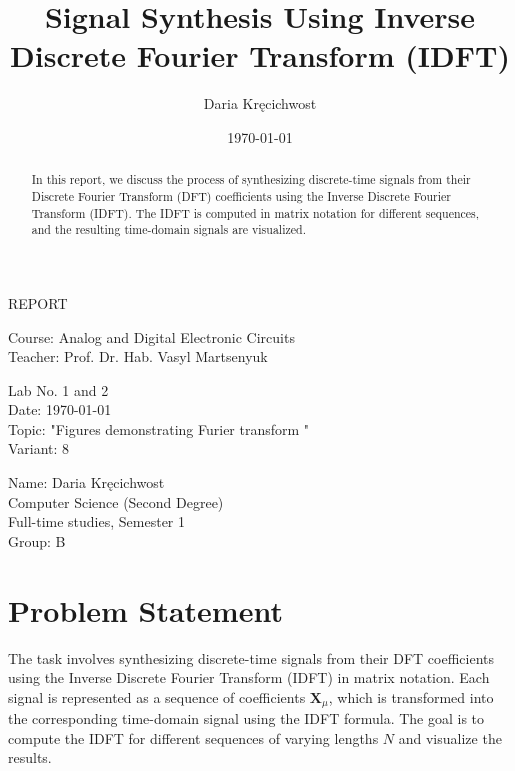 \documentclass[12pt]{article}
\title{Signal Synthesis Using Inverse Discrete Fourier Transform (IDFT)}
\author{Daria Kręcichwost}
\date{\today}
\begin{document}
\begin{titlepage}
    \centering
    \vspace*{2cm}
    
    \Huge
    REPORT
    
    \vspace{1cm}
    
    \Large
    Course: Analog and Digital Electronic Circuits \\
    Teacher: Prof. Dr. Hab. Vasyl Martsenyuk
    
    \vfill
    
    \Large
    Lab No. 1 and 2\\
    Date: \today \\
    Topic: "Figures demonstrating Furier transform " \\
    Variant: 8
    
    \vspace{1cm}
    
    \large
    Name: Daria Kręcichwost \\
    Computer Science (Second Degree) \\
    Full-time studies, Semester 1 \\
    Group: B
\end{titlepage}

\newpage

\maketitle

\begin{abstract}
In this report, we discuss the process of synthesizing discrete-time signals from their Discrete Fourier Transform (DFT) coefficients using the Inverse Discrete Fourier Transform (IDFT). The IDFT is computed in matrix notation for different sequences, and the resulting time-domain signals are visualized.
\end{abstract}

\section{Problem Statement}

The task involves synthesizing discrete-time signals from their DFT coefficients using the Inverse Discrete Fourier Transform (IDFT) in matrix notation. Each signal is represented as a sequence of coefficients \( \mathbf{X}_\mu \), which is transformed into the corresponding time-domain signal using the IDFT formula. The goal is to compute the IDFT for different sequences of varying lengths \( N \) and visualize the results.
\end{document}
